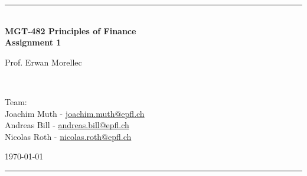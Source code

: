 \documentclass[a4paper,11pt,twoside]{article}
\newcommand{\mail}[1]{{\href{mailto:#1}{#1}}}
\begin{document}
\begin{titlepage} %
\begin{center}
\newcommand{\HRule}{\rule{\linewidth}{0.5mm}} %
\center %
 
 




\begin{figure} [h] %
\centerline{
} 
\end{figure}

\HRule \\[0.4cm]
{ \huge \bfseries MGT-482 Principles of Finance \\Assignment 1}\\[0.4cm] %

\begin{minipage}[t]{0.4\textwidth}
\flushleft
Prof. Erwan Morellec
\end{minipage}
~
\begin{minipage}[t]{0.55\textwidth}
\flushright
Team: \\
Joachim Muth - \mail{joachim.muth@epfl.ch}\\
Andreas Bill - \mail{andreas.bill@epfl.ch}\\
Nicolas Roth - \mail{nicolas.roth@epfl.ch}\\
\end{minipage}
\begin{center}
\today
\end{center}
\HRule \\

\end{center}
\end{titlepage}



\pagestyle{fancy}

\end{document}

